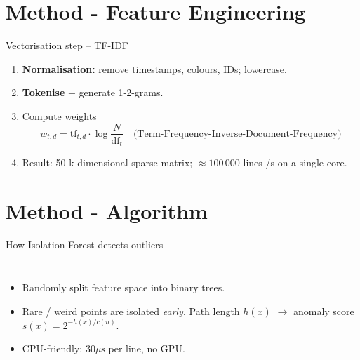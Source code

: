 \documentclass[14pt,aspectratio=169,draft]{beamer}
\newcommand{\TFIDF}{Term-Frequency-Inverse-Document-Frequency\xspace}
\begin{document}
\section{Method - Feature Engineering}
\begin{frame}{Vectorisation step  – TF-IDF}
\small
\begin{enumerate}[<+->]
  \item \textbf{Normalisation:} remove timestamps, colours, IDs; lowercase.
  \item \textbf{Tokenise} + generate 1-2-grams.
  \item Compute weights  
        \[
          w_{t,d}= \mathrm{tf}_{t,d}\cdot
          \log\frac{N}{\mathrm{df}_t}\quad\text{(\TFIDF{})}
        \]
  \item Result: 50 k-dimensional sparse matrix;  
        \(\approx 100\,000\) lines /s on a single core.
\end{enumerate}

\vspace{0.5em}
\centering
{}
\end{frame}

\section{Method - Algorithm }
\begin{frame}{How Isolation-Forest detects outliers}
\begin{columns}
\begin{itemize}[<+->]
  \item Randomly split feature space into binary trees.
  \item Rare / weird points are isolated \emph{early}.  
        Path length \(h(x)\) $\rightarrow$ anomaly score  
        \(s(x)=2^{-h(x)/c(n)}\).
  \item CPU-friendly: \(30 \mu\text{s}\) per line, no GPU.
\end{itemize}

\centering
\begin{adjustbox}{max width=\linewidth}
\end{adjustbox}
\end{columns}
\end{frame}
\end{document}

